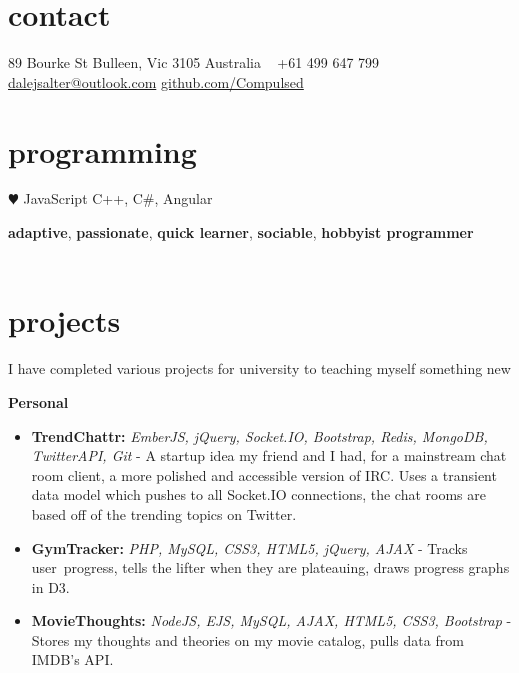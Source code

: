 \documentclass[]{friggeri-cv} %
\begin{document}

\begin{aside} %
\section{contact}
89 Bourke St
Bulleen, Vic 3105
Australia
~
+61 499 647 799
~
\href{mailto:dalejsalter@outlook.com}{dalejsalter@outlook.com}
\href{http://www.github.com/Compulsed/}{github.com/Compulsed}
\section{programming}
{\color{red} $\varheartsuit$} JavaScript
C++, C\#, Angular
\end{aside}


\textbf{adaptive}, \textbf{passionate}, \textbf{quick learner}, \textbf{sociable}, \textbf{hobbyist programmer} \\ \\

\section{projects}
I have completed various projects for university to teaching myself something new

{
  \large\textbf{Personal}
}
\begin{itemize}
    \item \textbf{TrendChattr:} \emph{EmberJS, jQuery, Socket.IO, Bootstrap, Redis, MongoDB, TwitterAPI, Git} -
        A startup idea my friend and I had, for a mainstream chat room client, a more polished
         and accessible version of IRC.
        Uses a transient data model which pushes to all Socket.IO connections,
        the chat rooms are based off of the trending topics on Twitter.
    \item \textbf{GymTracker:} \emph{PHP, MySQL, CSS3, HTML5, jQuery, AJAX} -
        Tracks user progress, tells the lifter when they are plateauing, draws progress graphs in D3.
    \item \textbf{MovieThoughts:} \emph{NodeJS, EJS, MySQL, AJAX, HTML5, CSS3, Bootstrap} -
        Stores my thoughts and theories on my movie catalog, pulls data from IMDB's API.
\end{itemize}
\end{document}
